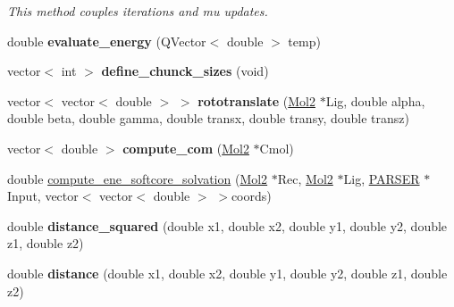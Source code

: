 \begin{DoxyCompactItemize}
\begin{DoxyCompactList}\small\item\em This method couples iterations and mu updates. \item\end{DoxyCompactList}\item 
\hypertarget{classDeal_a83199504a901a2844d182196b1d644f3}{
double {\bfseries evaluate\_\-energy} (QVector$<$ double $>$ temp)}
\label{classDeal_a83199504a901a2844d182196b1d644f3}

\item 
\hypertarget{classDeal_a8737d935dbc8958518c16a24b4b26257}{
vector$<$ int $>$ {\bfseries define\_\-chunck\_\-sizes} (void)}
\label{classDeal_a8737d935dbc8958518c16a24b4b26257}

\item 
\hypertarget{classDeal_af455962f09d71519e0651b7bc5822b2f}{
vector$<$ vector$<$ double $>$ $>$ {\bfseries rototranslate} (\hyperlink{classMol2}{Mol2} $\ast$Lig, double alpha, double beta, double gamma, double transx, double transy, double transz)}
\label{classDeal_af455962f09d71519e0651b7bc5822b2f}

\item 
\hypertarget{classDeal_a4c14bc771b0b80045bb30224e8c4eb30}{
vector$<$ double $>$ {\bfseries compute\_\-com} (\hyperlink{classMol2}{Mol2} $\ast$Cmol)}
\label{classDeal_a4c14bc771b0b80045bb30224e8c4eb30}

\item 
double \hyperlink{classDeal_a413250a08bd09f48c746b046f2fe832f}{compute\_\-ene\_\-softcore\_\-solvation} (\hyperlink{classMol2}{Mol2} $\ast$Rec, \hyperlink{classMol2}{Mol2} $\ast$Lig, \hyperlink{classPARSER}{PARSER} $\ast$Input, vector$<$ vector$<$ double $>$ $>$coords)
\item 
\hypertarget{classDeal_ab47d9b35bd969fb1dda4ae259ff818a2}{
double {\bfseries distance\_\-squared} (double x1, double x2, double y1, double y2, double z1, double z2)}
\label{classDeal_ab47d9b35bd969fb1dda4ae259ff818a2}

\item 
\hypertarget{classDeal_a8769484e9659041ff51605729733635c}{
double {\bfseries distance} (double x1, double x2, double y1, double y2, double z1, double z2)}
\label{classDeal_a8769484e9659041ff51605729733635c}

\end{DoxyCompactItemize}

